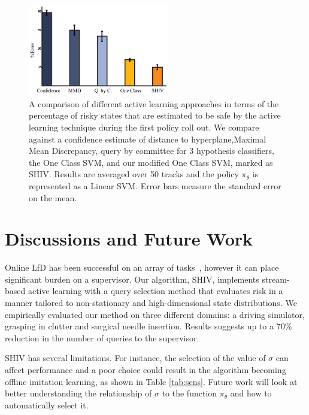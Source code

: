 \documentclass[10pt, conference]{ieeeconf}      %
\begin{document}
\begin{figure}[t]
\centering
\includegraphics[width=\columnwidth, height=4cm]{figures/risk_bar.eps}
\caption {  \footnotesize A comparison of different active learning approaches in terms of the percentage of risky states that are estimated to be safe by the active learning technique during the first policy roll out. We compare against a confidence estimate of distance to hyperplane,Maximal Mean Discrepancy, query by committee for 3 hypothesis classifiers, the One Class SVM, and our modified One Class SVM, marked as SHIV.  Results  are averaged over 50 tracks and the policy $\pi_\theta$ is represented as a Linear SVM. Error bars measure the standard error on the mean.
   }
\vspace*{-20pt}
\label{fig:active_comp}
\end{figure}





\section{Discussions and Future Work}
Online LfD has been successful on an array of tasks~\cite{NIPS2014_5421,ross2010reduction}, however it can place significant burden on a supervisor. Our algorithm, SHIV, implements stream-based active learning with a query selection method that evaluates risk in a manner tailored to non-stationary and high-dimensional state distributions. We empirically evaluated our method on three different domains: a driving simulator, grasping in clutter and surgical needle insertion. Results suggests up to a $70\%$ reduction in the number of queries to the supervisor. 

SHIV has several limitations. For instance, the selection of the value of $\sigma$ can affect performance and a poor choice could result in the algorithm becoming offline imitation learning, as shown in Table \ref{tab:sens}. Future work will look at better understanding the relationship of $\sigma$ to the function $\pi_{\theta}$ and how to automatically select it. 
\end{document}
